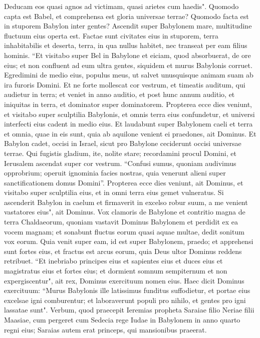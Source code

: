 \begin{biblechapter}
\verse Deducam eos quasi agnos ad victimam, quasi arietes cum haedis". 
\verse Quomodo capta est Babel, et comprehensa est gloria universae terrae? Quomodo facta est in stuporem Babylon inter gentes? 
\verse Ascendit super Babylonem mare, multitudine fluctuum eius operta est. 
\verse Factae sunt civitates eius in stuporem, terra inhabitabilis et deserta, terra, in qua nullus habitet, nec transeat per eam filius hominis. 
\verse “Et visitabo super Bel in Babylone et eiciam, quod absorbuerat, de ore eius; et non confluent ad eum ultra gentes, siquidem et murus Babylonis corruet. 
\verse Egredimini de medio eius, populus meus, ut salvet unusquisque animam suam ab ira furoris Domini. 
\verse Et ne forte mollescat cor vestrum, et timeatis auditum, qui audietur in terra; et veniet in anno auditio, et post hunc annum auditio, et iniquitas in terra, et dominator super dominatorem. 
\verse Propterea ecce dies veniunt, et visitabo super sculptilia Babylonis, et omnis terra eius confundetur, et universi interfecti eius cadent in medio eius. 
\verse Et laudabunt super Babylonem caeli et terra et omnia, quae in eis sunt, quia ab aquilone venient ei praedones, ait Dominus. 
\verse Et Babylon cadet, occisi in Israel, sicut pro Babylone ceciderunt occisi universae terrae. 
\verse Qui fugistis gladium, ite, nolite stare; recordamini procul Domini, et Ierusalem ascendat super cor vestrum. 
\verse “Confusi sumus, quoniam audivimus opprobrium; operuit ignominia facies nostras, quia venerunt alieni super sanctificationem domus Domini”. 
\verse Propterea ecce dies veniunt, ait Dominus, et visitabo super sculptilia eius, et in omni terra eius gemet vulneratus. 
\verse Si ascenderit Babylon in caelum et firmaverit in excelso robur suum, a me venient vastatores eius", ait Dominus. 
\verse Vox clamoris de Babylone et contritio magna de terra Chaldaeorum, 
\verse quoniam vastavit Dominus Babylonem et perdidit ex ea vocem magnam; et sonabunt fluctus eorum quasi aquae multae, dedit sonitum vox eorum. 
\verse Quia venit super eam, id est super Babylonem, praedo; et apprehensi sunt fortes eius, et fractus est arcus eorum, quia Deus ultor Dominus reddens retribuet. 
\verse “Et inebriabo principes eius et sapientes eius et duces eius et magistratus eius et fortes eius; et dormient somnum sempiternum et non expergiscentur", ait rex, Dominus exercituum nomen eius. 
\verse Haec dicit Dominus exercituum: “Murus Babylonis ille latissimus funditus suffodietur, et portae eius excelsae igni comburentur; et laboraverunt populi pro nihilo, et gentes pro igni lassatae sunt". 
\verse Verbum, quod praecepit Ieremias propheta Saraiae filio Neriae filii Maasiae, cum pergeret cum Sedecia rege Iudae in Babylonem in anno quarto regni eius; Saraias autem erat princeps, qui mansionibus praeerat. 

\end{biblechapter}
